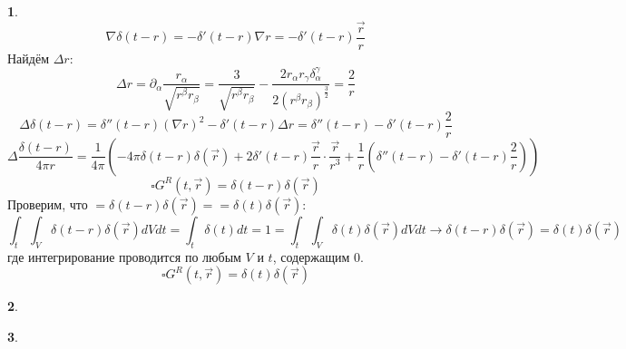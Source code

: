 \documentclass[12pt]{article}
\theoremstyle{definition}
\newtheorem{zad}{}[section]
\begin{document}
\begin{zad}
\begin{equation}
\end{equation}
\begin{equation}
    \nabla\delta(t-r)=-\delta'(t-r)\nabla r=-\delta'(t-r)\frac{\vec{r}}{r}
\end{equation}
Найдём $\Delta r$:
\begin{equation}
    \Delta r=\partial_\alpha\frac{r_\alpha}{\sqrt{r^\beta r_\beta}}=\frac{3}{\sqrt{r^\beta r_\beta}}-\frac{2r_\alpha r_\gamma\delta^\gamma_\alpha}{2(r^\beta r_\beta)^\frac{3}{2}}=\frac{2}{r}
\end{equation}
\begin{equation}
    \Delta\delta(t-r)=\delta''(t-r)(\nabla r)^2-\delta'(t-r)\Delta r=\delta''(t-r)-\delta'(t-r)\frac{2}{r}
\end{equation}
\begin{equation}
    \Delta\frac{\delta(t-r)}{4\pi r}=\frac{1}{4\pi}\left(-4\pi\delta(t-r)\delta(\vec{r})+2\delta'(t-r)\frac{\vec{r}}{r}\cdot\frac{\vec{r}}{r^3}+\frac{1}{r}\left(\delta''(t-r)-\delta'(t-r)\frac{2}{r}\right)\right)
\end{equation}
\begin{equation}
    \square G^R(t,\vec{r})=\delta(t-r)\delta(\vec{r})
\end{equation}
Проверим, что $=\delta(t-r)\delta(\vec{r})==\delta(t)\delta(\vec{r})$:
\begin{equation}
    \int_t\int_V\delta(t-r)\delta(\vec{r})dVdt=\int_t \delta(t)dt=1=\int_t\int_V\delta(t)\delta(\vec{r})dVdt\rightarrow \delta(t-r)\delta(\vec{r})=\delta(t)\delta(\vec{r})
\end{equation}
где интегрирование проводится по любым $V$ и $t$, содержащим 0.
\begin{equation}
    \boxed{\square G^R(t,\vec{r})=\delta(t)\delta(\vec{r})}
\end{equation}
\end{zad}
\begin{zad}

\end{zad}
\begin{zad}

\end{zad}
\end{document}
